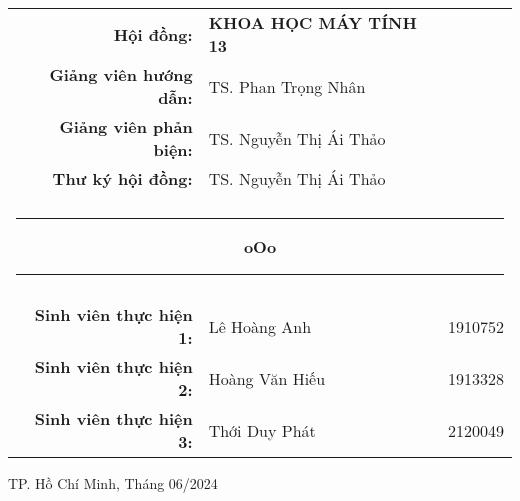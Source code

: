 \begin{titlepage}
    \begingroup
        \fontsize{14pt}{12pt}\selectfont
        \begin{center}
            \begin{tabular}{rll}
                \color{black} \textbf{Hội đồng:} & \color{black} \textbf{KHOA HỌC MÁY TÍNH 13} &  \\
                \color{black} \textbf{Giảng viên hướng dẫn:} & \color{black} TS. Phan Trọng Nhân &  \\
                \color{black} \textbf{Giảng viên phản biện:} & \color{black} TS. Nguyễn Thị Ái Thảo &  \\
                \color{black} \textbf{Thư ký hội đồng:} & \color{black} TS. Nguyễn Thị Ái Thảo &  \\
                \\

                \multicolumn{3}{c}{\noindent\rule{4cm}{0.5pt} \textbf{oOo} \noindent\rule{4cm}{0.5pt}} \\ \\
                \color{black}\textbf{Sinh viên thực hiện 1:} & \color{black}Lê Hoàng Anh & \color{black}1910752 \\
                \color{black}\textbf{Sinh viên thực hiện 2:} & \color{black}Hoàng Văn Hiếu & \color{black}1913328 \\
                \color{black}\textbf{Sinh viên thực hiện 3:} & \color{black}Thới Duy Phát & \color{black}2120049 \\
            \end{tabular}
        \end{center}
    \endgroup
    
    \vspace{1.5cm}

    \begingroup
        \fontsize{12pt}{12pt}\selectfont
        \begin{center}
            {TP. Hồ Chí Minh, Tháng 06/2024}
        \end{center}
    \endgroup
    
\end{titlepage}
